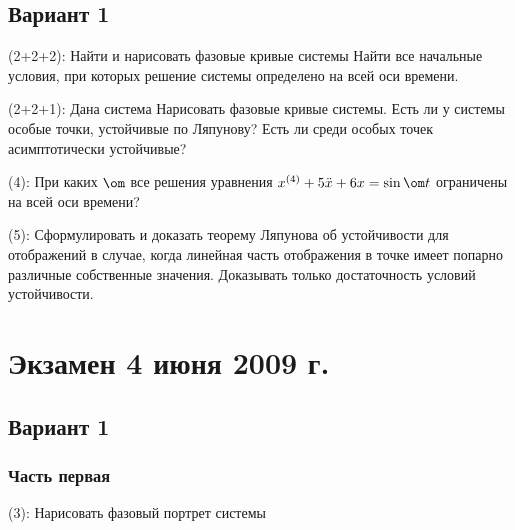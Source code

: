 \documentclass[a4paper]{article}
\newcommand{\skill}[1]{\textsf{(#1):}}
\begin{document}
\subsection{Вариант 1}

\begin{problem}
\skill{2+2+2} Найти и нарисовать фазовые кривые системы
Найти все начальные условия, при которых решение системы определено на всей оси времени.
\end{problem}

\begin{problem}
\skill{2+2+1}
Дана система
Нарисовать фазовые кривые системы. Есть ли у системы особые точки, устойчивые
по Ляпунову? Есть ли среди особых точек асимптотически устойчивые?
\end{problem}

\begin{problem}
\skill{4}
При каких $\om$ все решения уравнения $x^{(4)}+ 5 \ddot x + 6 x = \sin \om t$ ограничены
на всей оси времени?
\end{problem}

\begin{problem}
\skill{5}
Сформулировать и доказать теорему Ляпунова об устойчивости для отображений в случае, когда линейная часть
отображения в точке имеет попарно различные собственные значения. Доказывать только
достаточность условий устойчивости.
\end{problem}

\section{Экзамен 4 июня 2009 г.}

\subsection{Вариант 1}

\subsubsection{Часть первая}

\begin{problem}
\skill{3}  Нарисовать фазовый портрет системы 
\end{problem}
\end{document}
